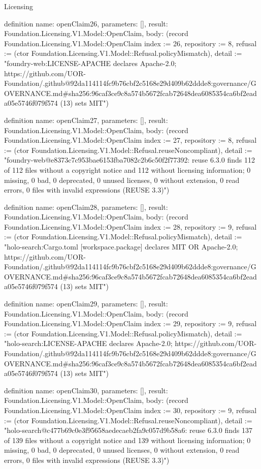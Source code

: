 \begin{lexlean}{Licensing}
\begin{semanticmodule}
definition{
  name: openClaim26,
  parameters: [],
  result: Foundation.Licensing.V1.Model::OpenClaim,
  body: (record Foundation.Licensing.V1.Model::OpenClaim {index := 26, repository := 8, refusal := (ctor Foundation.Licensing.V1.Model::Refusal.policyMismatch), detail := "foundry-web:LICENSE-APACHE declares Apache-2.0; https://github.com/UOR-Foundation/.github@92da114114fc9b76cbf2c5168e29d409b62ddde8:governance/GOVERNANCE.md#sha256:96caf3ce9c8a574b5672fcab72648dea6085354ca6bf2eada05e5746f079f574 (13) sets MIT"})
}

definition{
  name: openClaim27,
  parameters: [],
  result: Foundation.Licensing.V1.Model::OpenClaim,
  body: (record Foundation.Licensing.V1.Model::OpenClaim {index := 27, repository := 8, refusal := (ctor Foundation.Licensing.V1.Model::Refusal.reuseNoncompliant), detail := "foundry-web@e8373c7c953bae6153fba7082c2b6c50f2f77392: reuse 6.3.0 finds 112 of 112 files without a copyright notice and 112 without licensing information; 0 missing, 0 bad, 0 deprecated, 0 unused licenses, 0 without extension, 0 read errors, 0 files with invalid expressions (REUSE 3.3)"})
}

definition{
  name: openClaim28,
  parameters: [],
  result: Foundation.Licensing.V1.Model::OpenClaim,
  body: (record Foundation.Licensing.V1.Model::OpenClaim {index := 28, repository := 9, refusal := (ctor Foundation.Licensing.V1.Model::Refusal.policyMismatch), detail := "holo-search:Cargo.toml [workspace.package] declares MIT OR Apache-2.0; https://github.com/UOR-Foundation/.github@92da114114fc9b76cbf2c5168e29d409b62ddde8:governance/GOVERNANCE.md#sha256:96caf3ce9c8a574b5672fcab72648dea6085354ca6bf2eada05e5746f079f574 (13) sets MIT"})
}

definition{
  name: openClaim29,
  parameters: [],
  result: Foundation.Licensing.V1.Model::OpenClaim,
  body: (record Foundation.Licensing.V1.Model::OpenClaim {index := 29, repository := 9, refusal := (ctor Foundation.Licensing.V1.Model::Refusal.policyMismatch), detail := "holo-search:LICENSE-APACHE declares Apache-2.0; https://github.com/UOR-Foundation/.github@92da114114fc9b76cbf2c5168e29d409b62ddde8:governance/GOVERNANCE.md#sha256:96caf3ce9c8a574b5672fcab72648dea6085354ca6bf2eada05e5746f079f574 (13) sets MIT"})
}

definition{
  name: openClaim30,
  parameters: [],
  result: Foundation.Licensing.V1.Model::OpenClaim,
  body: (record Foundation.Licensing.V1.Model::OpenClaim {index := 30, repository := 9, refusal := (ctor Foundation.Licensing.V1.Model::Refusal.reuseNoncompliant), detail := "holo-search@c477b69c0e3f95658aedecaeb2fa9c057d9b58a6: reuse 6.3.0 finds 137 of 139 files without a copyright notice and 139 without licensing information; 0 missing, 0 bad, 0 deprecated, 0 unused licenses, 0 without extension, 0 read errors, 0 files with invalid expressions (REUSE 3.3)"})
}


\end{semanticmodule}
\end{lexlean}
